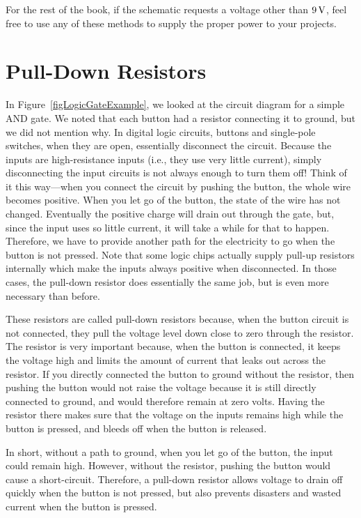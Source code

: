 
For the rest of the book, if the schematic requests a voltage other than $9\,\si{\volt}$, feel free to use any of these methods to supply the proper power to your projects.

\section{Pull-Down Resistors}
\label{secPullDownResistors}

In Figure~\ref{figLogicGateExample}, we looked at the circuit diagram for a simple AND gate.  
We noted that each button had a resistor connecting it to ground, but we did not mention why.
In digital logic circuits, buttons and single-pole switches, when they are open, essentially disconnect the circuit.
Because the inputs are high-resistance inputs (i.e., they use very little current), simply disconnecting the input circuits is not always enough to turn them off!
Think of it this way---when you connect the circuit by pushing the button, the whole wire becomes positive.
When you let go of the button, the state of the wire has not changed.
Eventually the positive charge will drain out through the gate, but, since the input uses so little current, it will take a while for that to happen.
Therefore, we have to provide another path for the electricity to go when the button is not pressed.
Note that some logic chips actually supply pull-up resistors internally which make the inputs always positive when disconnected.  
In those cases, the pull-down resistor does essentially the same job, but is even more necessary than before.

These resistors are called pull-down resistors because, when the button circuit is not connected, they pull the voltage level down close to zero through the resistor.
The resistor is very important because, when the button is connected, it keeps the voltage high and limits the amount of current that leaks out across the resistor.
If you directly connected the button to ground without the resistor, then pushing the button would not raise the voltage because it is still directly connected to ground, and would therefore remain at zero volts.  
Having the resistor there makes sure that the voltage on the inputs remains high while the button is pressed, and bleeds off when the button is released.

In short, without a path to ground, when you let go of the button, the input could remain high.
However, without the resistor, pushing the button would cause a short-circuit.
Therefore, a pull-down resistor allows voltage to drain off quickly when the button is not pressed, but also prevents disasters and wasted current when the button is pressed.


